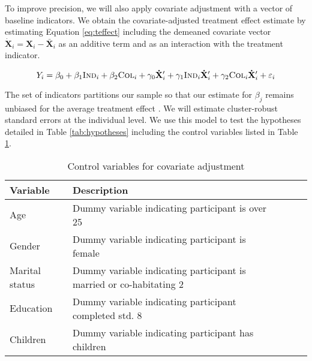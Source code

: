 \documentclass[11pt, a4paper]{article}\usepackage[]{graphicx}\usepackage[]{color}
\begin{document}
        To improve precision, we will also apply covariate adjustment with a vector of baseline indicators. We obtain the covariate-adjusted treatment effect estimate by estimating Equation \ref{eq:teffect} including the demeaned covariate vector $\mathbf{\dot X}_{i} = \mathbf{X}_{i} - \mathbf{\bar X}_{i}$ as an additive term and as an interaction with the treatment indicator.

        \begin{equation} \label{eq:controls}
            Y_{i} = \beta_{0} + \beta_{1}\text{\textsc{Ind}}_{i} + \beta_{2}\text{\textsc{Col}}_{i} + \gamma_{0} \mathbf{\dot X}'_i + \gamma_{1}\text{\textsc{Ind}}_{i} \mathbf{\dot X}'_i + \gamma_{2}\text{\textsc{Col}}_{i} \mathbf{\dot X}'_i + \varepsilon_{i}
        \end{equation}

        The set of indicators partitions our sample so that our estimate for $\beta_j$ remains unbiased for the average treatment effect \parencite{lin_agnostic_2013}. We will estimate cluster-robust standard errors at the individual level. We use this model to test the hypotheses detailed in Table \ref{tab:hypotheses} including the control variables listed in Table \ref{tab:controlvars}.

        \begin{table}[h]
        \centering
        \caption{Control variables for covariate adjustment}
        \label{tab:controlvars}
        \begin{tabular}{@{}lllll@{}}
        \toprule
        Variable                                     & Description                                          &  &  &  \\ \midrule
        Age & Dummy variable indicating participant is over 25 &  &  &  \\
        Gender & Dummy variable indicating participant is female &  &  &  \\
        Marital status & Dummy variable indicating participant is married or co-habitating 2 &  &  &  \\
        Education & Dummy variable indicating participant completed std. 8 &  &  &  \\
        Children & Dummy variable indicating participant has children &  &  &  \\ \bottomrule
        \end{tabular}
        \end{table}

\end{document}
